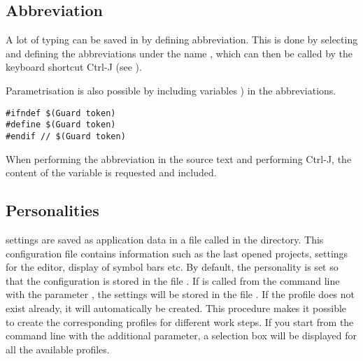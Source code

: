 \subsection{Abbreviation}\label{sec:abbreviation}

A lot of typing can be saved in \codeblocks by defining abbreviation. This is done by selecting  and defining the abbreviations under the name , which can then be called by the keyboard shortcut Ctrl-J (see ).


Parametrisation is also possible by including variables ) in the abbreviations.

\begin{lstlisting}
#ifndef $(Guard token)
#define $(Guard token)
#endif // $(Guard token)
\end{lstlisting}

When performing the abbreviation  in the source text and performing Ctrl-J, the content of the variable is requested and included.

\subsection{Personalities}\label{sec:personalities}

\codeblocks settings are saved as application data in a file called  in the  directory. This configuration file contains information such as the last opened projects, settings for the editor, display of symbol bars etc. By default, the  personality is set so that the configuration is stored in the file . If \codeblocks is called from the command line with the parameter , the settings will be stored in the file . If the profile does not exist already, it will automatically be created. This procedure makes it possible to create the corresponding profiles for different work steps. If you start \codeblocks from the command line with the additional parameter, a selection box will be displayed for all the available profiles.


